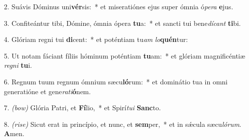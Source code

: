 2. Suávis Dóminus uni\textbf{vér}sis:~* et miseratiónes ejus super ómnia ó\textit{pe}\textit{ra} \textbf{e}jus.

3. Confiteántur tibi, Dómine, ómnia ópera \textbf{tu}a:~* et sancti tui bene\textit{dí}\textit{cant} \textbf{ti}bi.

4. Glóriam regni tui \textbf{di}cent:~* et poténtiam tu\textit{am} \textit{lo}\textbf{quén}tur:

5. Ut notam fáciant fíliis hóminum poténtiam \textbf{tu}am:~* et glóriam magnificéntiæ \textit{re}\textit{gni} \textbf{tu}i.

6. Regnum tuum regnum ómnium sæcu\textbf{ló}rum:~* et dominátio tua in omni generatióne et gene\textit{ra}\textit{ti}\textbf{ó}nem.

7. {\color{red}\textit{(bow)}} Glória Patri, et \textbf{Fí}lio,~* et Spirí\textit{tu}\textit{i} \textbf{Sanc}to.

8. {\color{red}\textit{(rise)}} Sicut erat in princípio, et nunc, et \textbf{sem}per,~* et in s\'{\ae}cula sæcu\textit{ló}\textit{rum}. \textbf{A}men.

